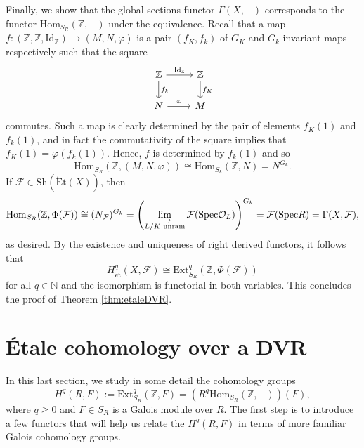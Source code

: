 \documentclass{article}
\newcommand{\Hom}{\mathrm{Hom}}
\newcommand{\ext}{\mathrm{Ext}}
\newcommand{\Spec}{\mathrm{Spec}}
\newcommand{\Et}{\acute{\mathrm{E}}\mathrm{t}}
\newcommand{\et}{\acute{\mathrm{e}}\mathrm{t}}
\newcommand{\Sh}{\mathrm{Sh}}
\newcommand{\Id}{\mathrm{Id}}
\newcommand{\N}{\mathbb{N}}
\newcommand{\Z}{\mathbb{Z}}
\theoremstyle{plain}
\theoremstyle{definition}
\begin{document}
    Finally, we show that the global sections functor $\Gamma(X,-)$ corresponds to the functor $\Hom_{S_R}(\Z,-)$ under the equivalence. Recall that a map $f:(\Z,\Z,\Id_\Z)\to(M,N,\varphi)$ is a pair $(f_K,f_k)$ of $G_K$ and $G_k$-invariant maps respectively such that the square
    \[
        \begin{tikzcd}
            \Z \arrow[r,"\Id_\Z"] \arrow[d,"f_k"] & \Z \arrow[d,"f_K"] \\
            N \arrow[r,"\varphi"] & M
        \end{tikzcd}
    \]
    commutes. Such a map is clearly determined by the pair of elements $f_K(1)$ and $f_k(1)$, and in fact the commutativity of the square implies that $f_K(1)=\varphi(f_k(1))$. Hence, $f$ is determined by $f_k(1)$ and so $$\Hom_{S_R}(\Z,(M,N,\varphi))\cong\Hom_{S_k}(\Z,N)=N^{G_k}.$$
    If $\mathcal{F}\in\Sh(\Et(X))$, then $$\Hom_{S_R}(\Z,\Phi(\mathcal{F}))\cong (N_\mathcal{F})^{G_k}=\left(\varinjlim_{\substack{L/K \text{ unram}}}\mathcal{F}(\Spec\mathcal{O}_L)\right)^{G_k}=\mathcal{F}(\Spec R)=\Gamma(X,\mathcal{F}),$$
    as desired. By the existence and uniqueness of right derived functors, it follows that 
    $$H^q_{\et}(X,\mathcal{F})\cong\ext_{S_R}^q(\Z,\Phi(\mathcal{F}))$$
    for all $q\in\N$ and the isomorphism is functorial in both variables. This concludes the proof of Theorem \ref{thm:etaleDVR}.

    \section{\'{E}tale cohomology over a DVR}
    In this last section, we study in some detail the cohomology groups
    $$H^q(R,F):=\ext^q_{S_R}(\Z,F)=(R^q\Hom_{S_R}(\Z,-))(F),$$
    where $q\geq 0$ and $F\in S_R$ is a Galois module over $R$. The first step is to introduce a few functors that will help us relate the $H^q(R,F)$ in terms of more familiar Galois cohomology groups.
\end{document}
